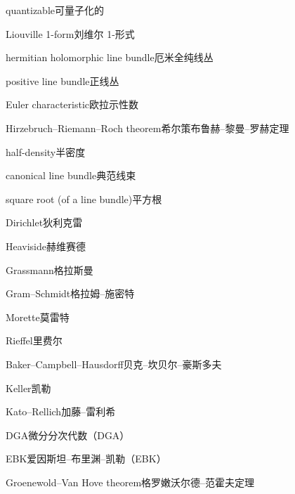 \begin{multicols}{2}
quantizable\hspace{0.9em}可量子化的\par
Liouville 1-form\hspace{0.9em}刘维尔 1-形式\par
hermitian holomorphic line bundle\hspace{0.9em}厄米全纯线丛\par
positive line bundle\hspace{0.9em}正线丛\par
Euler characteristic\hspace{0.9em}欧拉示性数\par
Hirzebruch–Riemann–Roch theorem\hspace{0.9em}希尔策布鲁赫–黎曼–罗赫定理\par
half-density\hspace{0.9em}半密度\par
canonical line bundle\hspace{0.9em}典范线束\par
square root (of a line bundle)\hspace{0.9em}平方根\par
Dirichlet\hspace{0.9em}狄利克雷\par
Heaviside\hspace{0.9em}赫维赛德\par
Grassmann\hspace{0.9em}格拉斯曼\par
Gram–Schmidt\hspace{0.9em}格拉姆–施密特\par
Morette\hspace{0.9em}莫雷特\par
Rieffel\hspace{0.9em}里费尔\par
Baker–Campbell–Hausdorff\hspace{0.9em}贝克–坎贝尔–豪斯多夫\par
Keller\hspace{0.9em}凯勒\par
Kato–Rellich\hspace{0.9em}加藤–雷利希\par
DGA\hspace{0.9em}微分分次代数（DGA）\par
EBK\hspace{0.9em}爱因斯坦–布里渊–凯勒（EBK）\par
Groenewold–Van Hove theorem\hspace{0.9em}格罗嫩沃尔德–范霍夫定理\par

\end{multicols}
